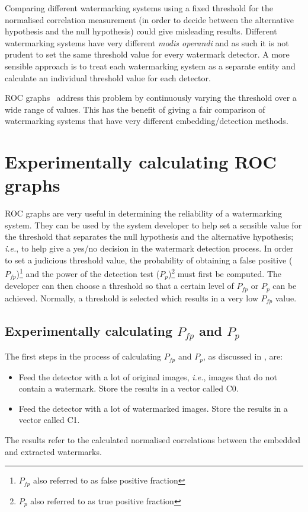 \documentclass[12pt]{report}
\begin{document}
Comparing different watermarking systems using a fixed threshold for the normalised correlation
measurement (in order to decide between the alternative hypothesis and the null hypothesis) could give misleading results.
Different watermarking systems have very different \emph{modis operandi} and as such it is not prudent 
to set the same threshold value for every watermark detector. A more sensible approach is to 
treat each watermarking system as a separate entity and calculate an individual threshold value
for each detector. 

ROC graphs~\cite{rocChak92, rocErk98} address this problem by continuously varying the threshold over 
a wide range of values. This has the benefit of giving a fair comparison of
watermarking systems that have very different embedding/detection methods.



\section{Experimentally calculating ROC graphs}
ROC graphs are very useful in determining the reliability of a watermarking system. 
They can be used by the system developer to help set a sensible value for the
threshold that separates the null hypothesis and the alternative hypothesis; \emph{i.e.},
to help give a yes/no decision in the watermark detection process.
In order to set a judicious threshold value, the probability of obtaining a false positive 
($P_{fp}$)\footnote{$P_{fp}$ also referred to as false positive fraction} and
the power of the detection test 
($P_{p}$)\footnote{$P_{p}$ also referred to as true positive fraction} must first be computed.
The developer can then choose a threshold so that a certain level of $P_{fp}$ or $P_{p}$
can be achieved. Normally, a threshold is selected which results in a very low
$P_{fp}$ value. 

\subsection{Experimentally calculating $P_{fp}$ and $P_{p}$}
The first steps in the process of calculating $P_{fp}$ and $P_{p}$, as discussed in \cite{wmWorld}, are:
\begin{itemize}
	\item Feed the detector with a lot of original images, \emph{i.e.}, images that
	do not contain a watermark. Store the results in a vector called C0.
	
	\item Feed the detector with a lot of watermarked images. Store the results in a 
	vector called C1. 
\end{itemize}
The results refer to the calculated normalised correlations between the embedded and extracted 
watermarks.
\end{document}
